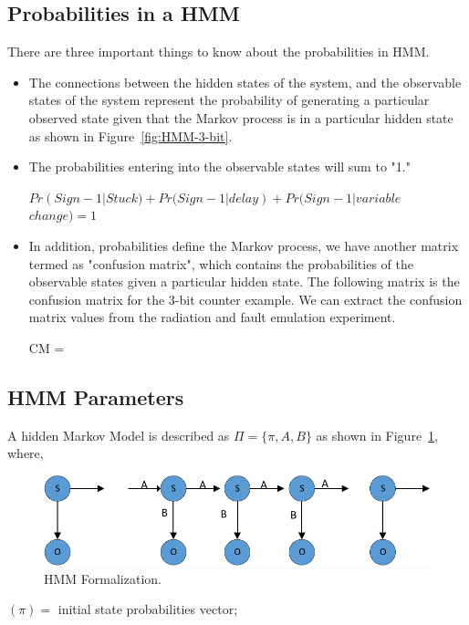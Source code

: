 \subsection{Probabilities in a HMM}
There are three important things to know about the probabilities in HMM.
\begin{itemize}
\item The connections between the hidden states of the system, and the observable states of the system represent the probability of generating a particular observed state given that the Markov process is in a particular hidden state as shown in Figure~\ref{fig:HMM-3-bit}.
\item The probabilities entering into the observable states will sum to "1." 
\begin{center}
$Pr(Sign-1|Stuck) + Pr(Sign-1|delay) + Pr(Sign-1|variable $ $ change)  = 1 $
\end{center}
\item In addition, probabilities define the Markov process, we have another matrix termed as "confusion matrix", which contains the probabilities of the observable states given a particular hidden state. The following matrix is the confusion matrix for the 3-bit counter example. We can extract the confusion matrix values from the radiation and fault emulation experiment.
\begin{center}
CM = 
\end{center}
\end{itemize}
\subsection{HMM Parameters}
A hidden Markov Model is described as $ \Pi = \{\pi, A, B\}$ as shown in Figure~\ref{fig:MARKOV-SERIS}, where,
\begin{figure}[tb!]
 \centering
  \captionsetup{justification=centering}    
   \includegraphics[scale=0.8]{Figures/MARKOV-SERIS.pdf}
   \caption{HMM Formalization.}
\label{fig:MARKOV-SERIS}
\end{figure}
 $(\pi) = $ initial state probabilities vector; 

